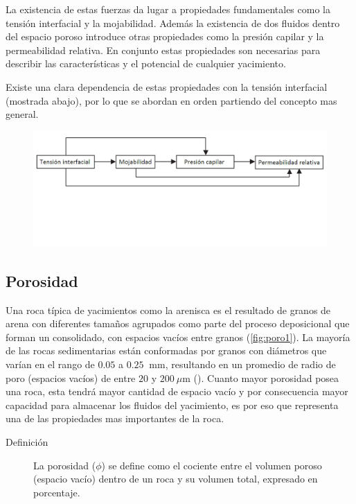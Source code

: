 La existencia de estas fuerzas da lugar a propiedades fundamentales como la tensión interfacial y la mojabilidad. Además la existencia de dos fluidos dentro del espacio poroso introduce otras propiedades como la presión capilar y la permeabilidad relativa. En conjunto estas propiedades son necesarias para describir las características y el potencial de cualquier yacimiento.

Existe una clara dependencia de estas propiedades con la tensión interfacial (mostrada abajo), por lo que se abordan en orden partiendo del concepto mas general.

\begin{figure}[h]
    \centering
    \includegraphics[width=\textwidth]{Graphics/dependencia.png}
    \label{fig:dependencia}
\end{figure}

\subsection{Porosidad}
Una roca típica de yacimientos como la arenisca es el resultado de granos de arena con diferentes tamaños agrupados como parte del proceso deposicional que forman un consolidado, con espacios vacíos entre granos (\autoref{fig:poro1}). La mayoría de las rocas sedimentarias están conformadas por granos con diámetros que varían en el rango de $0.05$ a $0.25~$ mm, resultando en un promedio de radio de poro (espacios vacíos) de entre $20$ y $200~\mu$m (\cite{Tissot}). Cuanto mayor porosidad posea una roca, esta tendrá mayor cantidad de espacio vacío y por consecuencia mayor capacidad para almacenar los fluidos del yacimiento, es por eso que representa una de las propiedades mas importantes de la roca.

\begin{description}
    \item[Definición] La porosidad ($\phi$) se define como el cociente entre el volumen poroso (espacio vacío) dentro de un roca y su volumen total, expresado en porcentaje.
\end{description}

